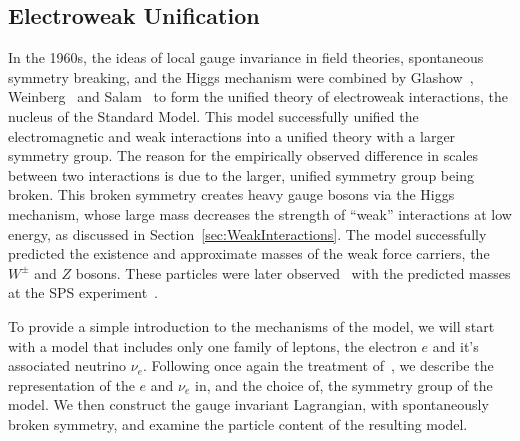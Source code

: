 \subsection{Electroweak Unification}

In the 1960s, the ideas of local gauge invariance in field theories, spontaneous
symmetry breaking, and the Higgs mechanism were combined by
Glashow~\cite{GlashowEW}, Weinberg~\cite{WeinbergEW} and Salam~\cite{SalamEW} to
form the unified theory of electroweak interactions, the nucleus of the Standard
Model.  This model successfully unified the electromagnetic and weak
interactions into a unified theory with a larger symmetry group.  The reason for
the empirically observed difference in scales between two interactions is due to
the larger, unified symmetry group being broken.  This broken symmetry creates
heavy gauge bosons via the Higgs mechanism, whose large mass decreases the
strength of ``weak'' interactions at low energy, as discussed in
Section~\ref{sec:WeakInteractions}.  The model successfully predicted the
existence and approximate masses of the weak force carriers, the $W^\pm$ and $Z$
bosons.  These particles were later observed~\cite{SPSWandZDiscovery} with the
predicted masses at the SPS experiment~\cite{SPSexperiment}. 

To provide a simple introduction to the mechanisms of the model, we will start
with a model that includes only one family of leptons, the electron $e$ and it's
associated neutrino $\nu_e$. Following once again the treatment
of~\cite{Morii:SMandBSM}, we describe the representation of the $e$ and $\nu_e$
in, and the choice of, the symmetry group of the model.  We then construct the
gauge invariant Lagrangian, with spontaneously broken symmetry, and examine the
particle content of the resulting model.

